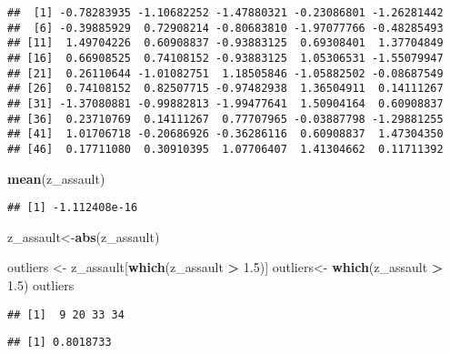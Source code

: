 \documentclass[]{article}
\newenvironment{Shaded}{\begin{snugshade}}{\end{snugshade}}
\newcommand{\KeywordTok}[1]{\textcolor[rgb]{0.13,0.29,0.53}{\textbf{#1}}}
\newcommand{\FloatTok}[1]{\textcolor[rgb]{0.00,0.00,0.81}{#1}}
\newcommand{\StringTok}[1]{\textcolor[rgb]{0.31,0.60,0.02}{#1}}
\newcommand{\CommentTok}[1]{\textcolor[rgb]{0.56,0.35,0.01}{\textit{#1}}}
\newcommand{\OperatorTok}[1]{\textcolor[rgb]{0.81,0.36,0.00}{\textbf{#1}}}
\newcommand{\NormalTok}[1]{#1}
\begin{document}
\begin{verbatim}
##  [1] -0.78283935 -1.10682252 -1.47880321 -0.23086801 -1.26281442
##  [6] -0.39885929  0.72908214 -0.80683810 -1.97077766 -0.48285493
## [11]  1.49704226  0.60908837 -0.93883125  0.69308401  1.37704849
## [16]  0.66908525  0.74108152 -0.93883125  1.05306531 -1.55079947
## [21]  0.26110644 -1.01082751  1.18505846 -1.05882502 -0.08687549
## [26]  0.74108152  0.82507715 -0.97482938  1.36504911  0.14111267
## [31] -1.37080881 -0.99882813 -1.99477641  1.50904164  0.60908837
## [36]  0.23710769  0.14111267  0.77707965 -0.03887798 -1.29881255
## [41]  1.01706718 -0.20686926 -0.36286116  0.60908837  1.47304350
## [46]  0.17711080  0.30910395  1.07706407  1.41304662  0.11711392
\end{verbatim}

\begin{Shaded}
\begin{Highlighting}[]
\KeywordTok{mean}\NormalTok{(z_assault)}
\end{Highlighting}
\end{Shaded}

\begin{verbatim}
## [1] -1.112408e-16
\end{verbatim}

\begin{Shaded}
\begin{Highlighting}[]
\NormalTok{z_assault<-}\KeywordTok{abs}\NormalTok{(z_assault)}

\NormalTok{outliers <-}\StringTok{ }\NormalTok{z_assault[}\KeywordTok{which}\NormalTok{(z_assault }\OperatorTok{>}\StringTok{ }\FloatTok{1.5}\NormalTok{)]}
\NormalTok{outliers<-}\StringTok{ }\KeywordTok{which}\NormalTok{(z_assault }\OperatorTok{>}\StringTok{ }\FloatTok{1.5}\NormalTok{)}
\NormalTok{outliers}
\end{Highlighting}
\end{Shaded}

\begin{verbatim}
## [1]  9 20 33 34
\end{verbatim}

\begin{Shaded}
\end{Shaded}

\begin{verbatim}
## [1] 0.8018733
\end{verbatim}
\end{document}
